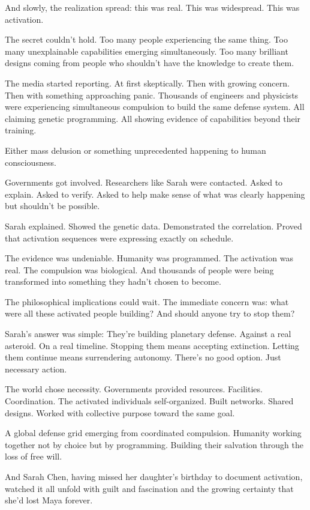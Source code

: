 And slowly, the realization spread: this was real. This was widespread. This was activation.

The secret couldn't hold. Too many people experiencing the same thing. Too many unexplainable capabilities emerging simultaneously. Too many brilliant designs coming from people who shouldn't have the knowledge to create them.

The media started reporting. At first skeptically. Then with growing concern. Then with something approaching panic. Thousands of engineers and physicists were experiencing simultaneous compulsion to build the same defense system. All claiming genetic programming. All showing evidence of capabilities beyond their training.

Either mass delusion or something unprecedented happening to human consciousness.

Governments got involved. Researchers like Sarah were contacted. Asked to explain. Asked to verify. Asked to help make sense of what was clearly happening but shouldn't be possible.

Sarah explained. Showed the genetic data. Demonstrated the correlation. Proved that activation sequences were expressing exactly on schedule.

The evidence was undeniable. Humanity was programmed. The activation was real. The compulsion was biological. And thousands of people were being transformed into something they hadn't chosen to become.

The philosophical implications could wait. The immediate concern was: what were all these activated people building? And should anyone try to stop them?

Sarah's answer was simple: They're building planetary defense. Against a real asteroid. On a real timeline. Stopping them means accepting extinction. Letting them continue means surrendering autonomy. There's no good option. Just necessary action.

The world chose necessity. Governments provided resources. Facilities. Coordination. The activated individuals self-organized. Built networks. Shared designs. Worked with collective purpose toward the same goal.

A global defense grid emerging from coordinated compulsion. Humanity working together not by choice but by programming. Building their salvation through the loss of free will.

And Sarah Chen, having missed her daughter's birthday to document activation, watched it all unfold with guilt and fascination and the growing certainty that she'd lost Maya forever.

